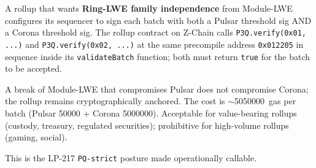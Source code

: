 A rollup that wants \textbf{Ring-LWE family independence} from
Module-LWE configures its sequencer to sign each batch with
both a Pulsar threshold sig AND a Corona threshold sig. The
rollup contract on Z-Chain calls \texttt{P3Q.verify(0x01, ...)}
and \texttt{P3Q.verify(0x02, ...)} at the same precompile
address \texttt{0x012205} in sequence inside its
\texttt{validateBatch} function; both must return \texttt{true}
for the batch to be accepted.

A break of Module-LWE that compromises Pulsar does not
compromise Corona; the rollup remains cryptographically
anchored. The cost is $\sim$\SI{5050000}{gas} per batch
(Pulsar \SI{50000}{} + Corona \SI{5000000}{}). Acceptable for
value-bearing rollups (custody, treasury, regulated securities);
prohibitive for high-volume rollups (gaming, social).

This is the LP-217 \texttt{PQ-strict} posture made operationally
callable.
